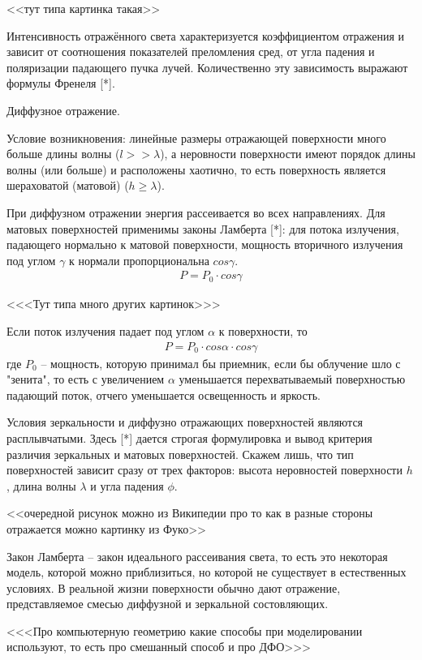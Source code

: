 <<тут типа картинка такая>>

Интенсивность отражённого света характеризуется коэффициентом отражения и зависит от соотношения показателей преломления сред, от угла падения и поляризации падающего пучка лучей. Количественно эту зависимость выражают формулы Френеля [*].

Диффузное отражение.

Условие возникновения: линейные размеры отражающей поверхности много больше длины волны ($ l >> \lambda $), а неровности поверхности имеют порядок длины волны (или больше) и расположены хаотично, то есть поверхность является шераховатой (матовой) ($ h \ge \lambda $). 

При диффузном отражении энергия рассеивается во всех направлениях. Для матовых поверхностей применимы законы Ламберта [*]: для потока излучения, падающего нормально к матовой поверхности, мощность вторичного излучения под углом $ \gamma $ к нормали пропорциональна $ cos \gamma $. 
\begin{gather}
 P = P_0 \cdot cos \gamma
\end {gather}

<<<Тут типа много других картинок>>>

Если поток излучения падает под углом $\alpha$ к поверхности, то 
\begin{gather}
 P = P_0 \cdot cos \alpha \cdot cos \gamma
\end {gather}
где $ P_0 $ -- мощность, которую принимал бы приемник, если бы облучение шло с "зенита", то есть с увеличением $\alpha$ уменьшается перехватываемый поверхностью падающий поток, отчего уменьшается освещенность и яркость. 

Условия зеркальности и диффузно отражающих поверхностей являются расплывчатыми. Здесь [*] дается строгая формулировка и вывод критерия различия зеркальных и матовых поверхностей. Скажем лишь, что тип поверхностей зависит сразу от трех факторов: высота неровностей поверхности $h$, длина волны $\lambda$ и угла падения $\phi$.

<<очередной рисунок можно из Википедии про то как в разные стороны отражается можно картинку из Фуко>>

Закон Ламберта -- закон идеального рассеивания света, то есть это некоторая модель, которой можно приблизиться, но которой не существует в естественных условиях. В реальной жизни поверхности обычно дают отражение, представляемое смесью диффузной и зеркальной состовляющих. 

<<<Про компьютерную геометрию какие способы при моделировании используют, то есть про смешанный способ и про ДФО>>>


